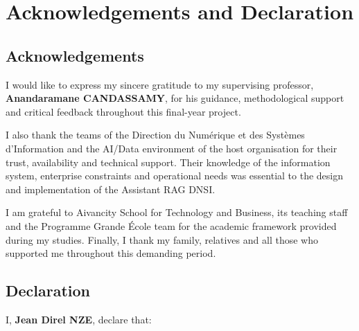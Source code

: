 
\chapter*{Acknowledgements and Declaration}

\section*{Acknowledgements}

I would like to express my sincere gratitude to my supervising professor, \textbf{Anandaramane CANDASSAMY}, for his guidance, methodological support and critical feedback throughout this final-year project.

I also thank the teams of the Direction du Numérique et des Systèmes d’Information and the AI/Data environment of the host organisation for their trust, availability and technical support. Their knowledge of the information system, enterprise constraints and operational needs was essential to the design and implementation of the Assistant RAG DNSI.

I am grateful to Aivancity School for Technology and Business, its teaching staff and the Programme Grande École team for the academic framework provided during my studies. Finally, I thank my family, relatives and all those who supported me throughout this demanding period.

\section*{Declaration}

I, \textbf{Jean Direl NZE}, declare that:

